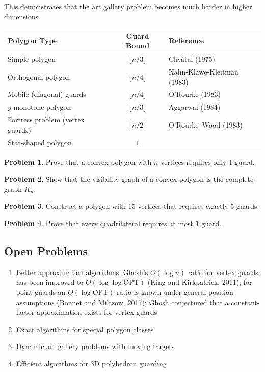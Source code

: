 \documentclass{article}
\theoremstyle{definition}
\newtheorem{problem}{Problem}
\begin{document}
This demonstrates that the art gallery problem becomes much harder in higher dimensions.


\begin{center}
\begin{tabular}{|l|c|l|}
\hline
\textbf{Polygon Type} & \textbf{Guard Bound} & \textbf{Reference} \\
\hline
Simple polygon & $\lfloor n/3 \rfloor$ & Chv\'{a}tal (1975) \\
Orthogonal polygon & $\lfloor n/4 \rfloor$ & Kahn-Klawe-Kleitman (1983) \\
Mobile (diagonal) guards & $\lfloor n/4 \rfloor$ & O'Rourke (1983) \\
$y$-monotone polygon & $\lfloor n/3 \rfloor$ & Aggarwal (1984) \\
Fortress problem (vertex guards) & $\lceil n/2 \rceil$ & O'Rourke--Wood (1983) \\
Star-shaped polygon & $1$ & \\
\hline
\end{tabular}
\end{center}


\begin{problem}
Prove that a convex polygon with $n$ vertices requires only 1 guard.
\end{problem}

\begin{problem}
Show that the visibility graph of a convex polygon is the complete graph $K_n$.
\end{problem}

\begin{problem}
Construct a polygon with 15 vertices that requires exactly 5 guards.
\end{problem}

\begin{problem}
Prove that every quadrilateral requires at most 1 guard.
\end{problem}

\subsection{Open Problems}

\begin{enumerate}[itemsep=0pt]
\item Better approximation algorithms: Ghosh's $O(\log n)$ ratio for vertex guards has been improved to $O(\log \log \mathrm{OPT})$ (King and Kirkpatrick, 2011); for point guards an $O(\log \mathrm{OPT})$ ratio is known under general-position assumptions (Bonnet and Miltzow, 2017); Ghosh conjectured that a constant-factor approximation exists for vertex guards
\item Exact algorithms for special polygon classes
\item Dynamic art gallery problems with moving targets
\item Efficient algorithms for 3D polyhedron guarding
\end{enumerate}
\end{document}
